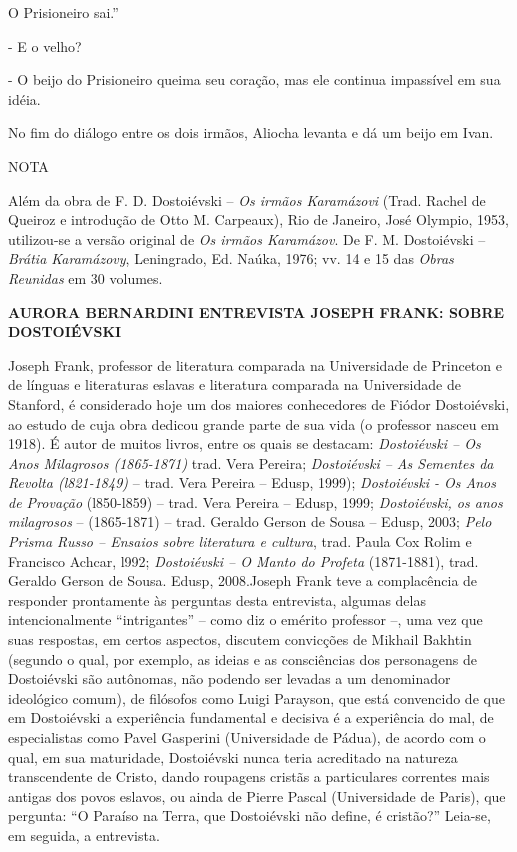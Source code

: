 O Prisioneiro sai.''

- E o velho?

- O beijo do Prisioneiro queima seu coração, mas ele continua impassível
em sua idéia.

No fim do diálogo entre os dois irmãos, Aliocha levanta e dá um beijo em
Ivan.

NOTA

Além da obra de F. D. Dostoiévski -- \emph{Os irmãos Karamázovi} (Trad.
Rachel de Queiroz e introdução de Otto M. Carpeaux), Rio de Janeiro,
José Olympio, 1953, utilizou-se a versão original de \emph{Os irmãos
Karamázov}. De F. M. Dostoiévski -- \emph{Brátia Karamázovy},
Leningrado, Ed. Naúka, 1976; vv. 14 e 15 das \emph{Obras Reunidas} em 30
volumes.

\textbf{AURORA BERNARDINI ENTREVISTA JOSEPH FRANK: SOBRE DOSTOIÉVSKI}

Joseph Frank, professor de literatura comparada na Universidade de
Princeton e de línguas e literaturas eslavas e literatura comparada na
Universidade de Stanford, é considerado hoje um dos maiores conhecedores
de Fiódor Dostoiévski, ao estudo de cuja obra dedicou grande parte de
sua vida (o professor nasceu em 1918). É autor de muitos livros, entre
os quais se destacam: \emph{Dostoiévski -- Os Anos Milagrosos
(1865-1871)} trad. Vera Pereira; \emph{Dostoiévski -- As Sementes da
Revolta (l821-1849)} -- trad. Vera Pereira -- Edusp, 1999);
\emph{Dostoiévski - Os Anos de Provação} (l850-l859) -- trad. Vera
Pereira -- Edusp, 1999; \emph{Dostoiévski, os anos milagrosos} --
(1865-1871) -- trad. Geraldo Gerson de Sousa -- Edusp, 2003; \emph{Pelo
Prisma Russo -- Ensaios sobre literatura e cultura}, trad. Paula Cox
Rolim e Francisco Achcar, l992; \emph{Dostoiévski -- O Manto do Profeta}
(1871-1881), trad. Geraldo Gerson de Sousa. Edusp, 2008.Joseph Frank
teve a complacência de responder prontamente às perguntas desta
entrevista, algumas delas intencionalmente ``intrigantes'' -- como diz o
emérito professor --, uma vez que suas respostas, em certos aspectos,
discutem convicções de Mikhail Bakhtin (segundo o qual, por exemplo, as
ideias e as consciências dos personagens de Dostoiévski são autônomas,
não podendo ser levadas a um denominador ideológico comum), de filósofos
como Luigi Parayson, que está convencido de que em Dostoiévski a
experiência fundamental e decisiva é a experiência do mal, de
especialistas como Pavel Gasperini (Universidade de Pádua), de acordo
com o qual, em sua maturidade, Dostoiévski nunca teria acreditado na
natureza transcendente de Cristo, dando roupagens cristãs a particulares
correntes mais antigas dos povos eslavos, ou ainda de Pierre Pascal
(Universidade de Paris), que pergunta: ``O Paraíso na Terra, que
Dostoiévski não define, é cristão?'' Leia-se, em seguida, a entrevista.


